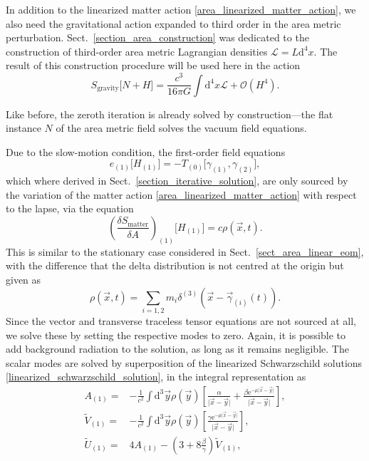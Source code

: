 In addition to the linearized matter action \eqref{area_linearized_matter_action}, we also need the gravitational action expanded to third order in the area metric perturbation. Sect.~\ref{section_area_construction} was dedicated to the construction of third-order area metric Lagrangian densities $\mathcal L = L \mathrm d^4x$. The result of this construction procedure will be used here in the action
\begin{equation}
  S_\text{gravity}\lbrack N+H\rbrack = \frac{c^3}{16\pi G}\int \mathrm d^4x \mathcal L + \mathcal O(H^4).
\end{equation}

Like before, the zeroth iteration is already solved by construction---the flat instance $N$ of the area metric field solves the vacuum field equations.

Due to the slow-motion condition, the first-order field equations
\begin{equation}
  e_{(1)}\lbrack H_{(1)}\rbrack = - T_{(0)}\lbrack\gamma_{(1)},\gamma_{(2)}\rbrack,
\end{equation}
which where derived in Sect.~\ref{section_iterative_solution}, are only sourced by the variation of the matter action \eqref{area_linearized_matter_action} with respect to the lapse, via the equation
\begin{equation}
  \left(\frac{\delta S_\text{matter}}{\delta A}\right)_{(1)}\lbrack H_{(1)}\rbrack = c \rho(\vec x,t).
\end{equation}
This is similar to the stationary case considered in Sect.~\ref{sect_area_linear_eom}, with the difference that the delta distribution is not centred at the origin but given as
\begin{equation}
  \rho(\vec x,t) = \sum_{i=1,2} m_i \delta^{(3)}(\vec x - \vec\gamma_{(i)}(t)).
\end{equation}
Since the vector and transverse traceless tensor equations are not sourced at all, we solve these by setting the respective modes to zero. Again, it is possible to add background radiation to the solution, as long as it remains negligible. The scalar modes are solved by superposition of the linearized Schwarzschild solutions \eqref{linearized_schwarzschild_solution}, in the integral representation as
\begin{equation}\label{area_schwarzschild_integral}
  \begin{aligned}
    A_{(1)} = {} & -\frac{1}{c^2} \int\mathrm d^3\vec y\rho(\vec y)\left\lbrack\frac{\alpha}{\lvert\vec x-\vec y\rvert} + \frac{\beta\mathrm e^{-\mu\lvert\vec x-\vec y\rvert}}{\lvert\vec x-\vec y\rvert} \right\rbrack, \\
    \tilde V_{(1)} = {} & -\frac{1}{c^2} \int\mathrm d^3\vec y\rho(\vec y)\left\lbrack\frac{\gamma\mathrm e^{-\mu\lvert\vec x-\vec y\rvert}}{\lvert\vec x-\vec y\rvert} \right\rbrack, \\
    \tilde U_{(1)} = {} & 4 A_{(1)} - (3 + 8 \frac{\beta}{\gamma})\tilde V_{(1)},
  \end{aligned}
\end{equation}
